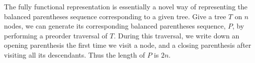 
The fully functional representation is essentially a novel way of representing the balanced parentheses sequence corresponding to a given tree. 
Give a tree $T$ on $n$ nodes, we can generate its corresponding balanced parentheses sequence, $P$, by performing a preorder traversal of $T$. 
During this traversal, we write down an opening parenthesis the first time we visit a node, and a closing parenthesis after visiting all its descendants. Thus the length of $P$ is $2n$.




